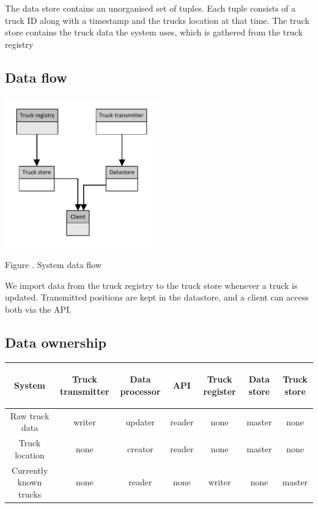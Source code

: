 \documentclass[a4paper,11pt]{report}
\newcommand{\mycaption}[1]{
  \addtocounter{figures}{1}
  Figure \arabic{figures}. #1
}
\begin{document}
The data store contains an unorganised set of tuples.  Each tuple
consists of a truck ID along with a timestamp and the trucks location
at that time. The truck store contains the truck data the system uses, which is gathered from the truck registry

\subsection{Data flow}
\label{sec:data-flow}

\begin{center}
  \includegraphics[width=0.5\textwidth]{figures/Data_flow}\\
  \mycaption{System data flow}
\end{center}
We import data from the truck registry to the truck store whenever a truck is updated. Transmitted positions are kept in the datastore, and a  client can access both via the API.

\subsection{Data ownership}
\label{sec:data-ownership}

\begin{tabular}{|c|c|c|c|c|c|c|}
\begin{sideways}\textbf{System}\end{sideways} & \begin{sideways}\textbf{Truck transmitter}\end{sideways} & \begin{sideways}\textbf{Data processor}\end{sideways} & \begin{sideways}\textbf{API}\end{sideways} & \begin{sideways}\textbf{Truck register}\end{sideways} & \begin{sideways}\textbf{Data store}\end{sideways} & \begin{sideways}\textbf{Truck store}\end{sideways} \\\hline
Raw truck data & writer & updater & reader & none & master & none \\\hline
Truck location & none & creator & reader & none & master & none \\\hline
Currently known trucks & none & reader & none & writer & none & master \\\hline
\end{tabular}
\end{document}
